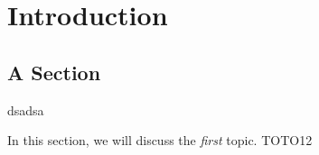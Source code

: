 \chapter{Introduction}

\section{A Section}

 dsadsa

In this section, we will discuss the \emph{first} topic.
TOTO12